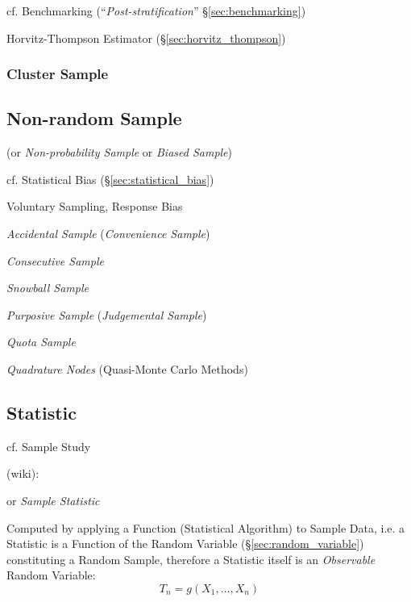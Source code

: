 cf. Benchmarking (``\emph{Post-stratification}'' \S\ref{sec:benchmarking})

Horvitz-Thompson Estimator (\S\ref{sec:horvitz_thompson})



\subsubsection{Cluster Sample}\label{sec:cluster_sample}



\subsection{Non-random Sample}\label{sec:nonrandom_sample}

(or \emph{Non-probability Sample} or \emph{Biased Sample})

cf. Statistical Bias (\S\ref{sec:statistical_bias})

Voluntary Sampling, Response Bias

\emph{Accidental Sample} (\emph{Convenience Sample})

\emph{Consecutive Sample}

\emph{Snowball Sample}

\emph{Purposive Sample} (\emph{Judgemental Sample})

\emph{Quota Sample}

\emph{Quadrature Nodes} (Quasi-Monte Carlo Methods) %



\subsection{Statistic}\label{sec:statistic}

cf. Sample Study

(wiki):

or \emph{Sample Statistic}

Computed by applying a Function (Statistical Algorithm) to Sample Data, i.e. a
Statistic is a Function of the Random Variable (\S\ref{sec:random_variable})
constituting a Random Sample, therefore a Statistic itself is an
\emph{Observable} Random Variable:
\[
  T_n = g(X_1, \ldots, X_n)
\]


